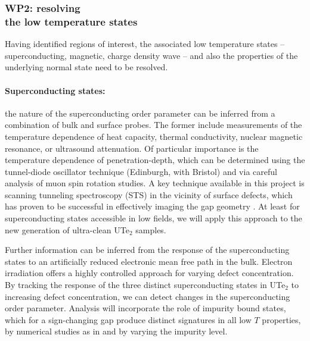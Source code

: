 \subsubsection*{WP2: resolving \\
the low temperature states}
\noindent
Having identified regions of interest, the associated low temperature states -- superconducting, magnetic, charge density wave -- and also the properties of the underlying normal state need to be resolved. 

\paragraph{Superconducting states:} the nature of the superconducting order parameter can be inferred from a combination of bulk and surface probes. The former include measurements of the temperature dependence of heat capacity, thermal conductivity, nuclear magnetic resonance, or ultrasound attenuation. Of particular importance is the temperature dependence of penetration-depth, which can be determined using the tunnel-diode oscillator technique (Edinburgh, with Bristol) and via careful analysis of muon spin rotation studies.
A key technique available in this project is scanning tunneling spectroscopy (STS) in the vicinity of surface defects, which has proven to be successful in effectively imaging the gap geometry \cite{}. At least for superconducting states accessible in low fields, we will apply this approach to the new generation of ultra-clean UTe$_2$ samples. 

Further information can be inferred from the response of the superconducting states to an artificially reduced electronic mean free path in the bulk. Electron irradiation offers a highly controlled approach for varying defect concentration. By tracking the response of the three distinct superconducting states in UTe$_2$ to increasing defect concentration, we can detect changes in the superconducting order parameter.
Analysis will incorporate the role of impurity bound states, which for a sign-changing gap produce distinct signatures in  all low $T$ properties, by numerical studies as in \cite{bang17} and by varying the impurity level.



